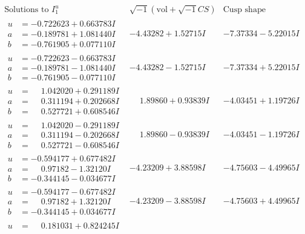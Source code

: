 \documentclass[1p]{elsarticle_modified}
\theoremstyle{definition}
\newcommand{\I}{\sqrt{-1}}
\begin{document}
$$\begin{array}{c|c|c}  
\text{Solutions to }I^u_{1}& \I (\text{vol} + \sqrt{-1}CS) & \text{Cusp shape}\\
 \hline 
\begin{aligned}
u &= -0.722623 + 0.663783 I \\
a &= -0.189781 + 1.081440 I \\
b &= -0.761905 + 0.077110 I\end{aligned}
 & -4.43282 + 1.52715 I & -7.37334 - 5.22015 I \\ \hline\begin{aligned}
u &= -0.722623 - 0.663783 I \\
a &= -0.189781 - 1.081440 I \\
b &= -0.761905 - 0.077110 I\end{aligned}
 & -4.43282 - 1.52715 I & -7.37334 + 5.22015 I \\ \hline\begin{aligned}
u &= \phantom{-}1.042020 + 0.291189 I \\
a &= \phantom{-}0.311194 + 0.202668 I \\
b &= \phantom{-}0.527721 + 0.608546 I\end{aligned}
 & \phantom{-}1.89860 + 0.93839 I & -4.03451 + 1.19726 I \\ \hline\begin{aligned}
u &= \phantom{-}1.042020 - 0.291189 I \\
a &= \phantom{-}0.311194 - 0.202668 I \\
b &= \phantom{-}0.527721 - 0.608546 I\end{aligned}
 & \phantom{-}1.89860 - 0.93839 I & -4.03451 - 1.19726 I \\ \hline\begin{aligned}
u &= -0.594177 + 0.677482 I \\
a &= \phantom{-}0.97182 - 1.32120 I \\
b &= -0.344145 - 0.034677 I\end{aligned}
 & -4.23209 + 3.88598 I & -4.75603 - 4.49965 I \\ \hline\begin{aligned}
u &= -0.594177 - 0.677482 I \\
a &= \phantom{-}0.97182 + 1.32120 I \\
b &= -0.344145 + 0.034677 I\end{aligned}
 & -4.23209 - 3.88598 I & -4.75603 + 4.49965 I \\ \hline\begin{aligned}
u &= \phantom{-}0.181031 + 0.824245 I \\

\end{aligned}
\end{array}$$
\end{document}
